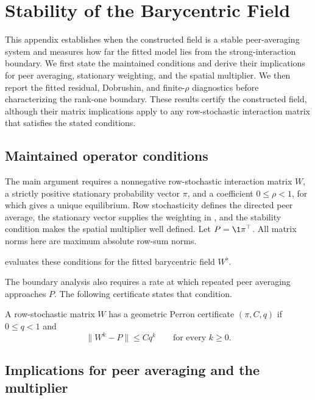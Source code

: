 \section{Stability of the Barycentric Field}
\label{sec:asymptotics}

This appendix establishes when the constructed field is a stable
peer-averaging system and measures how far the fitted model lies from the
strong-interaction boundary.
We first state the maintained conditions and derive their implications for peer
averaging, stationary weighting, and the spatial multiplier.
We then report the fitted residual, Dobrushin, and finite-$\rho$ diagnostics
before characterizing the rank-one boundary.
These results certify the constructed field, although their matrix implications
apply to any row-stochastic interaction matrix that satisfies the stated
conditions.

\subsection{Maintained operator conditions}

The main argument requires a nonnegative row-stochastic interaction matrix
$W$, a strictly positive stationary probability vector $\pi$, and a coefficient
$0\leq\rho<1$, for which  gives a unique equilibrium.
Row stochasticity defines the directed peer average, the stationary vector
supplies the weighting in , and the stability
condition makes the spatial multiplier well defined.
Let $P=\1\pi^\top$.
All matrix norms here are maximum absolute row-sum norms.

 evaluates these conditions for the fitted
barycentric field $W^\flat$.

The boundary analysis also requires a rate at which repeated peer averaging
approaches $P$.
The following certificate states that condition.

\begin{definition}
  \label{def:perron-limit}
  A row-stochastic matrix $W$ has a geometric Perron certificate
  $(\pi,C,q)$ if $0\leq q<1$ and
  \[
    \lVert W^k-P\rVert \leq Cq^k
    \qquad\text{for every }k\geq0.
  \]
\end{definition}

\subsection{Implications for peer averaging and the multiplier}

